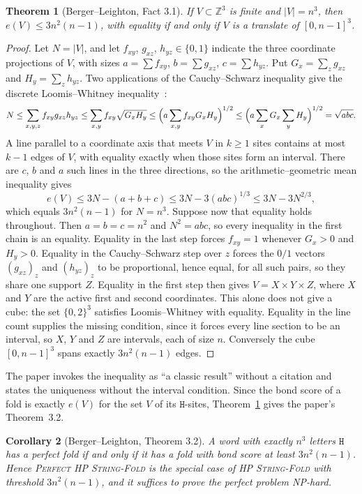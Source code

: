\documentclass[11pt,letterpaper]{article}
\newtheorem{theorem}{Theorem}
\newtheorem{corollary}[theorem]{Corollary}
\theoremstyle{definition}
\theoremstyle{remark}
\newcommand{\Hh}{\mathtt{H}}
\newcommand{\Z}{\mathbb{Z}}
\newcommand{\prob}[1]{\textup{\textsc{#1}}}
\begin{document}
\begin{theorem}[Berger--Leighton, Fact 3.1]\label{thm:cube}
If $V\subset\Z^3$ is finite and $|V|=n^3$, then $e(V)\le 3n^2(n-1)$, with equality if and only if $V$
is a translate of $[0,n-1]^3$.
\end{theorem}

\begin{proof}
Let $N=|V|$, and let $f_{xy}$, $g_{xz}$, $h_{yz}\in\{0,1\}$ indicate the three coordinate projections
of $V$, with sizes $a=\sum f_{xy}$, $b=\sum g_{xz}$, $c=\sum h_{yz}$. Put $G_x=\sum_z g_{xz}$ and
$H_y=\sum_z h_{yz}$. Two applications of the Cauchy--Schwarz inequality give the discrete
Loomis--Whitney inequality~\cite{LW49}:
\[
N\le\sum_{x,y,z}f_{xy}g_{xz}h_{yz}\le\sum_{x,y}f_{xy}\sqrt{G_xH_y}
\le\Bigl(a\sum_{x,y}f_{xy}G_xH_y\Bigr)^{1/2}\le\Bigl(a\sum_xG_x\sum_yH_y\Bigr)^{1/2}=\sqrt{abc}.
\]
A line parallel to a coordinate axis that meets $V$ in $k\ge1$ sites contains at most $k-1$ edges
of $V$, with equality exactly when those sites form an interval. There are $c$, $b$ and $a$ such
lines in the three directions, so the arithmetic--geometric mean inequality gives
\[
e(V)\le 3N-(a+b+c)\le 3N-3(abc)^{1/3}\le 3N-3N^{2/3},
\]
which equals $3n^2(n-1)$ for $N=n^3$. Suppose now that equality holds throughout. Then
$a=b=c=n^2$ and $N^2=abc$, so every inequality in the first chain is an equality. Equality in the last
step forces $f_{xy}=1$ whenever $G_x>0$ and $H_y>0$. Equality in the Cauchy--Schwarz step over $z$
forces the $0/1$ vectors $(g_{xz})_z$ and $(h_{yz})_z$ to be proportional, hence equal, for all such
pairs, so they share one support $Z$. Equality in the first step then gives $V=X\times Y\times Z$,
where $X$ and $Y$ are the active first and second coordinates. This alone does not give a cube: the
set $\{0,2\}^3$ satisfies Loomis--Whitney with equality. Equality in the line count supplies the
missing condition, since it forces every line section to be an interval, so $X$, $Y$ and $Z$ are
intervals, each of size $n$. Conversely the cube $[0,n-1]^3$ spans exactly $3n^2(n-1)$ edges.
\end{proof}

The paper invokes the inequality as ``a classic result'' without a citation and states the
uniqueness without the interval condition. Since the bond score of a fold is exactly $e(V)$ for the
set $V$ of its $\Hh$-sites, Theorem~\ref{thm:cube} gives the paper's Theorem~3.2.

\begin{corollary}[Berger--Leighton, Theorem 3.2]\label{cor:threshold}
A word with exactly $n^3$ letters $\Hh$ has a perfect fold if and only if it has a fold with bond
score at least $3n^2(n-1)$. Hence \prob{Perfect HP String-Fold} is the special case of
\prob{HP String-Fold} with threshold $3n^2(n-1)$, and it suffices to prove the perfect problem
NP-hard.
\end{corollary}
\end{document}
